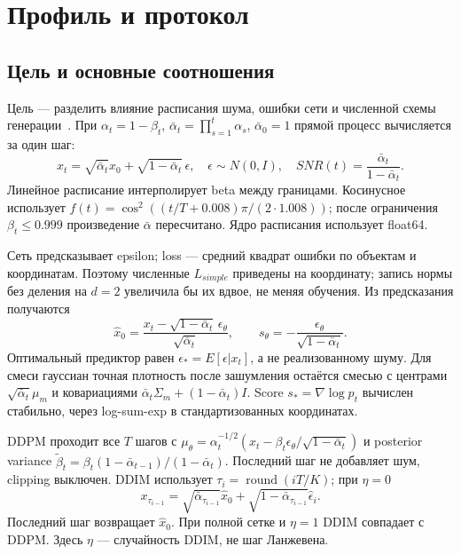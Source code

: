 \section{Профиль и протокол}
\subsection{Цель и основные соотношения}
Цель --- разделить влияние расписания шума, ошибки сети и численной схемы генерации~\cite{teacher}. При $\alpha_t=1-\beta_t$, $\bar\alpha_t=\prod_{s=1}^t\alpha_s$, $\bar\alpha_0=1$ прямой процесс вычисляется за один шаг:
\begin{equation}x_t=\sqrt{\bar\alpha_t}x_0+\sqrt{1-\bar\alpha_t}\,\epsilon,\quad \epsilon\sim N(0,I),\quad SNR(t)=\frac{\bar\alpha_t}{1-\bar\alpha_t}.\end{equation}
Линейное расписание интерполирует beta между границами. Косинусное использует $f(t)=\cos^2((t/T+0.008)\pi/(2\cdot1.008))$; после ограничения $\beta_t\le0.999$ произведение $\bar\alpha$ пересчитано. Ядро расписания использует float64.

Сеть предсказывает epsilon; loss --- средний квадрат ошибки по объектам и координатам. Поэтому численные $L_{simple}$ приведены на координату; запись нормы без деления на $d=2$ увеличила бы их вдвое, не меняя обучения. Из предсказания получаются
\begin{equation}\hat x_0=\frac{x_t-\sqrt{1-\bar\alpha_t}\,\epsilon_\theta}{\sqrt{\bar\alpha_t}},\qquad s_\theta=-\frac{\epsilon_\theta}{\sqrt{1-\bar\alpha_t}}.\end{equation}
Оптимальный предиктор равен $\epsilon_*=E[\epsilon|x_t]$, а не реализованному шуму. Для смеси гауссиан точная плотность после зашумления остаётся смесью с центрами $\sqrt{\bar\alpha_t}\mu_m$ и ковариациями $\bar\alpha_t\Sigma_m+(1-\bar\alpha_t)I$. Score $s_*=\nabla\log p_t$ вычислен стабильно, через log-sum-exp в стандартизованных координатах.

DDPM проходит все $T$ шагов с $\mu_\theta=\alpha_t^{-1/2}(x_t-\beta_t\epsilon_\theta/\sqrt{1-\bar\alpha_t})$ и posterior variance $\tilde\beta_t=\beta_t(1-\bar\alpha_{t-1})/(1-\bar\alpha_t)$. Последний шаг не добавляет шум, clipping выключен. DDIM использует $\tau_i=\operatorname{round}(iT/K)$; при $\eta=0$
\begin{equation}x_{\tau_{i-1}}=\sqrt{\bar\alpha_{\tau_{i-1}}}\hat x_0+\sqrt{1-\bar\alpha_{\tau_{i-1}}}\hat\epsilon_i.\end{equation}
Последний шаг возвращает $\hat x_0$. При полной сетке и $\eta=1$ DDIM совпадает с DDPM. Здесь $\eta$ --- случайность DDIM, не шаг Ланжевена.

